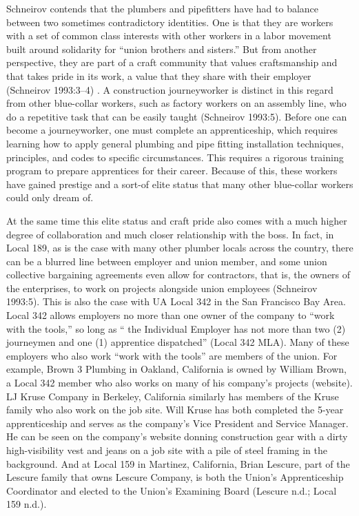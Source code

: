Schneirov contends that the plumbers and pipefitters have had to balance between two sometimes contradictory identities. One is that they are workers with a set of common class interests with other workers in a labor movement built around solidarity for “union brothers and sisters.” But from another perspective, they are part of a craft community that values craftsmanship and that takes pride in its work, a value that they share with their employer (Schneirov 1993:3–4) . A construction journeyworker is distinct in this regard from other blue-collar workers, such as factory workers on an assembly line, who do a repetitive task that can be easily taught (Schneirov 1993:5). Before one can become a journeyworker, one must complete an apprenticeship, which requires learning how to apply general plumbing and pipe fitting installation techniques, principles, and codes to specific circumstances. This requires a rigorous training program to prepare apprentices for their career. Because of this, these workers have gained prestige and a sort-of elite status that many other blue-collar workers could only dream of.

At the same time this elite status and craft pride also comes with a much higher degree of collaboration and much closer relationship with the boss. In fact, in Local 189, as is the case with many other plumber locals across the country, there can be a blurred line between employer and union member, and some union collective bargaining agreements even allow for contractors, that is, the owners of the enterprises, to work on projects alongside union employees (Schneirov 1993:5). This is also the case with UA Local 342 in the San Francisco Bay Area. Local 342 allows employers no more than one owner of the company to “work with the tools,” so long as “ the Individual Employer has not more than two (2) journeymen and one (1) apprentice dispatched” (Local 342 MLA). Many of these employers who also work “work with the tools” are members of the union. For example, Brown 3 Plumbing in Oakland, California is owned by William Brown, a Local 342 member who also works on many of his company’s projects (website). LJ Kruse Company in Berkeley, California similarly has members of the Kruse family who also work on the job site. Will Kruse has both completed the 5-year apprenticeship and serves as the company’s Vice President and Service Manager. He can be seen on the company’s website donning construction gear with a dirty high-visibility vest and jeans on a job site with a pile of steel framing in the background. And at Local 159 in Martinez, California, Brian Lescure, part of the Lescure family that owns Lescure Company, is both the Union’s Apprenticeship Coordinator and elected to the Union’s Examining Board (Lescure n.d.; Local 159 n.d.).

